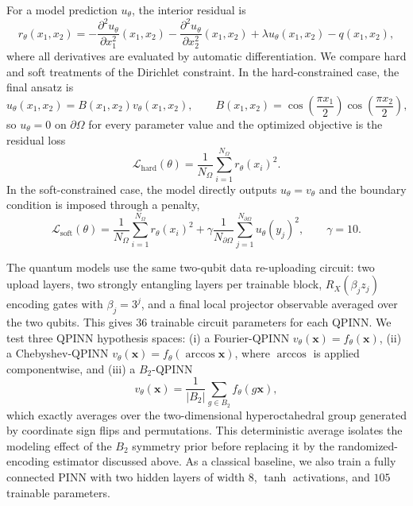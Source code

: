 \documentclass[%
 reprint,
 amsmath,amssymb,
 aps,
 pra,
]{revtex4-2}
\theoremstyle{definition}
\begin{document}
For a model prediction \(u_\theta\), the interior residual is
\begin{equation}
    r_\theta(x_1,x_2)=
    -\frac{\partial^2 u_\theta}{\partial x_1^2}(x_1,x_2)
    -\frac{\partial^2 u_\theta}{\partial x_2^2}(x_1,x_2)
    +\lambda u_\theta(x_1,x_2)
    -q(x_1,x_2),
\end{equation}
where all derivatives are evaluated by automatic differentiation. We compare hard and soft treatments of the Dirichlet constraint. In the hard-constrained case, the final ansatz is
\begin{equation}
    u_\theta(x_1,x_2)=B(x_1,x_2)v_\theta(x_1,x_2),
    \qquad
    B(x_1,x_2)=\cos\left(\frac{\pi x_1}{2}\right)\cos\left(\frac{\pi x_2}{2}\right),
\end{equation}
so \(u_\theta=0\) on \(\partial\Omega\) for every parameter value and the optimized objective is the residual loss
\begin{equation}
    \mathcal{L}_{\mathrm{hard}}(\theta)
    =\frac{1}{N_\Omega}\sum_{i=1}^{N_\Omega} r_\theta(x_i)^2.
\end{equation}
In the soft-constrained case, the model directly outputs \(u_\theta=v_\theta\) and the boundary condition is imposed through a penalty,
\begin{equation}
    \mathcal{L}_{\mathrm{soft}}(\theta)
    =\frac{1}{N_\Omega}\sum_{i=1}^{N_\Omega} r_\theta(x_i)^2
    +\gamma\frac{1}{N_{\partial\Omega}}\sum_{j=1}^{N_{\partial\Omega}}u_\theta(y_j)^2,
    \qquad \gamma=10.
\end{equation}

The quantum models use the same two-qubit data re-uploading circuit: two upload layers, two strongly entangling layers per trainable block, \(R_X(\beta_j z_j)\) encoding gates with \(\beta_j=3^j\), and a final local projector observable averaged over the two qubits. This gives \(36\) trainable circuit parameters for each QPINN. We test three QPINN hypothesis spaces: (i) a Fourier-QPINN \(v_\theta(\bm{x})=f_\theta(\bm{x})\), (ii) a Chebyshev-QPINN \(v_\theta(\bm{x})=f_\theta(\arccos\bm{x})\), where \(\arccos\) is applied componentwise, and (iii) a \(B_2\)-QPINN
\begin{equation}
    v_\theta(\bm{x})
    =\frac{1}{|B_2|}\sum_{g\in B_2} f_\theta(g\bm{x}),
\end{equation}
which exactly averages over the two-dimensional hyperoctahedral group generated by coordinate sign flips and permutations. This deterministic average isolates the modeling effect of the \(B_2\) symmetry prior before replacing it by the randomized-encoding estimator discussed above. As a classical baseline, we also train a fully connected PINN with two hidden layers of width \(8\), \(\tanh\) activations, and \(105\) trainable parameters.
\end{document}
